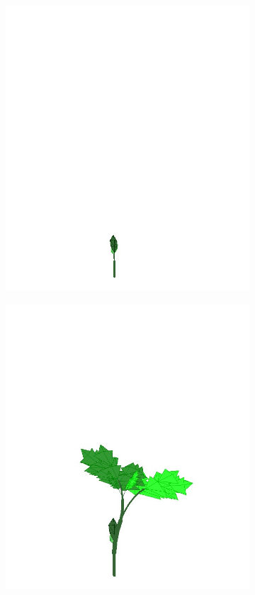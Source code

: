 \begin{figure}[h]
	\centering
	\begin{subfigure}{.24\textwidth}
		\centering
		\includegraphics[width=\linewidth]{carla/figures/plantAging001.jpg}
		\label{fig:sub1}
	\end{subfigure}
	\begin{subfigure}{.24\textwidth}
		\centering
		\includegraphics[width=\linewidth]{carla/figures/plantAging002.jpg}

\end{subfigure}
\end{figure}
